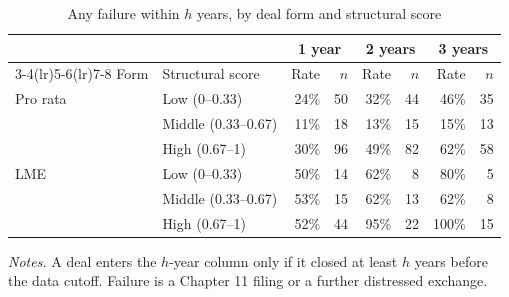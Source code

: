 \begin{table}[htbp]
\centering
\caption{Any failure within $h$ years, by deal form and structural score}
\label{tab:rates}
\begin{tabular}{llrrrrrr}
\toprule
 & & \multicolumn{2}{c}{1 year} & \multicolumn{2}{c}{2 years} & \multicolumn{2}{c}{3 years} \\
\cmidrule(lr){3-4}\cmidrule(lr){5-6}\cmidrule(lr){7-8}
Form & Structural score & Rate & $n$ & Rate & $n$ & Rate & $n$ \\
\midrule
Pro rata & Low (0--0.33) & 24\% & 50 & 32\% & 44 & 46\% & 35 \\
 & Middle (0.33--0.67) & 11\% & 18 & 13\% & 15 & 15\% & 13 \\
 & High (0.67--1) & 30\% & 96 & 49\% & 82 & 62\% & 58 \\
\addlinespace
LME & Low (0--0.33) & 50\% & 14 & 62\% & 8 & 80\% & 5 \\
 & Middle (0.33--0.67) & 53\% & 15 & 62\% & 13 & 62\% & 8 \\
 & High (0.67--1) & 52\% & 44 & 95\% & 22 & 100\% & 15 \\
\bottomrule
\end{tabular}
\begin{minipage}{0.9\textwidth}\vspace{4pt}\footnotesize
\textit{Notes.} A deal enters the $h$-year column only if it closed at least $h$ years before the data cutoff. Failure is a Chapter 11 filing or a further distressed exchange.
\end{minipage}
\end{table}
